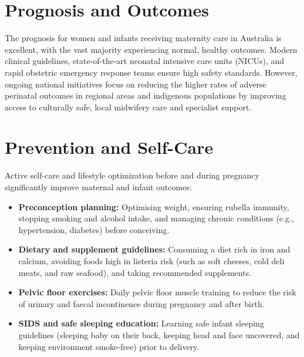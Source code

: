 \section*{Prognosis and Outcomes}
The prognosis for women and infants receiving maternity care in Australia is excellent, with the vast majority experiencing normal, healthy outcomes. Modern clinical guidelines, state-of-the-art neonatal intensive care units (NICUs), and rapid obstetric emergency response teams ensure high safety standards. However, ongoing national initiatives focus on reducing the higher rates of adverse perinatal outcomes in regional areas and indigenous populations by improving access to culturally safe, local midwifery care and specialist support.

\section*{Prevention and Self-Care}
Active self-care and lifestyle optimization before and during pregnancy significantly improve maternal and infant outcomes:
\begin{itemize}
    \item \textbf{Preconception planning:} Optimising weight, ensuring rubella immunity, stopping smoking and alcohol intake, and managing chronic conditions (e.g., hypertension, diabetes) before conceiving.
    \item \textbf{Dietary and supplement guidelines:} Consuming a diet rich in iron and calcium, avoiding foods high in listeria risk (such as soft cheeses, cold deli meats, and raw seafood), and taking recommended supplements.
    \item \textbf{Pelvic floor exercises:} Daily pelvic floor muscle training to reduce the risk of urinary and faecal incontinence during pregnancy and after birth.
    \item \textbf{SIDS and safe sleeping education:} Learning safe infant sleeping guidelines (sleeping baby on their back, keeping head and face uncovered, and keeping environment smoke-free) prior to delivery.
\end{itemize}

